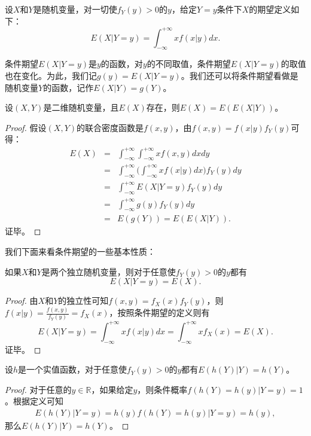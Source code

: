 \begin{definition}[条件数学期望]
设$X$和$Y$是随机变量，对一切使$f_Y(y)>0$的$y$，给定$Y=y$条件下$X$的期望定义如下：
\[
    E(X|Y=y) = \int_{-\infty}^{+\infty} xf(x|y)dx.
\]
\end{definition}
条件期望$E(X|Y=y)$是$y$的函数，对$y$的不同取值，条件期望$E(X|Y=y)$的取值也在变化。为此，我们记$g(y) = E(X|Y=y)$。我们还可以将条件期望看做是随机变量$Y$的函数，记作$E(X|Y)=g(Y)$。

\begin{theorem}[重期望公式]
设$(X,Y)$是二维随机变量，且$E(X)$存在，则$E(X)=E(E(X|Y))$。
\end{theorem}
\begin{proof}
假设$(X,Y)$的联合密度函数是$f(x,y)$，由$f(x,y)=f(x|y)f_Y(y)$可得：
\[
\begin{array}{lcl}
    E(X) & = & \int_{-\infty}^{+\infty} \int_{-\infty}^{+\infty} x f(x,y) dx dy\\
    &=& \int_{-\infty}^{+\infty}\big(\int_{-\infty}^{+\infty} xf(x|y) dx\big) f_Y(y) dy\\
    &=& \int_{-\infty}^{+\infty} E(X|Y=y) f_Y(y) dy\\
    &=& \int_{-\infty}^{+\infty} g(y) f_Y(y) dy\\
    &=& E(g(Y)) = E(E(X|Y)).
\end{array}
\]
证毕。
\end{proof}
我们下面来看条件期望的一些基本性质：
\begin{property}[独立性]
如果$X$和$Y$是两个独立随机变量，则对于任意使$f_Y(y)>0$的$y$都有\[E(X|Y=y)=E(X).\]
\end{property}
\begin{proof}
由$X$和$Y$的独立性可知$f(x,y)=f_X(x) f_Y(y)$，则$f(x|y)=\frac{f(x,y)}{f_Y(y)} = f_X(x)$，按照条件期望的定义则有
\[
    E(X|Y=y) = \int_{-\infty}^{+\infty} xf(x|y) dx = \int_{-\infty}^{+\infty} x f_X(x) = E(X).
\]
证毕。
\end{proof}
\begin{property}
设$h$是一个实值函数，对于任意使$f_Y(y)>0$的$y$都有$E(h(Y)|Y)=h(Y)$。
\end{property}
\begin{proof}
对于任意的$y\in \mathbb R$，如果给定$y$，则条件概率$f(h(Y) = h(y) | Y=y)=1$。根据定义可知
\[
\begin{array}{lcl}
    E(h(Y)|Y=y) = h(y) f(h(Y) = h(y) | Y=y) = h(y),
\end{array}
\]
那么$E(h(Y)|Y)=h(Y)$。
\end{proof}

